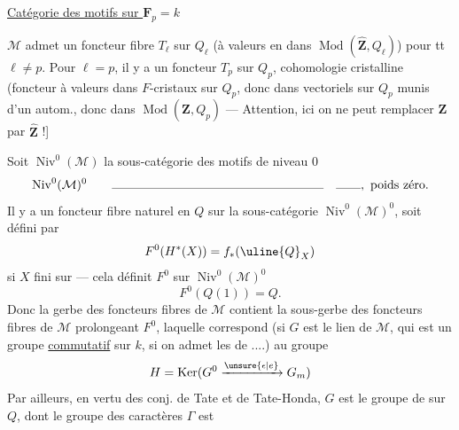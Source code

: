 \uline{Catégorie des motifs sur $\mathbf F_p=k$}

$\mathcal M$ admet un foncteur fibre $T_\ell$ sur $Q_\ell$ (à valeurs en dans $\operatorname{Mod}(\widehat{\mathbf Z},Q_\ell)$) pour tt $\ell\ne p$.
Pour $\ell=p$, il y a un foncteur $T_p$ sur $Q_p$, cohomologie cristalline (foncteur à valeurs dans $F$-cristaux sur $Q_p$, donc dans vectoriels sur $Q_p$ munis d'un autom., donc dans $\operatorname{Mod}(\mathbf Z,Q_p)$ --- Attention, ici on ne peut remplacer $\mathbf Z$ par $\widehat{\mathbf Z}$ !]

Soit  $\operatorname{Niv}^0(\mathcal M)$ la sous-catégorie des motifs de niveau $0$
\[
\operatorname{Niv}^0(\mathcal M)^0\qquad\rule{6cm}{0.3pt}\quad\rule{0.7cm}{0.3pt},\ \text{poids zéro.}
\]
Il y a un foncteur fibre naturel   en $Q$ sur la sous-catégorie $\operatorname{Niv}^0(\mathcal M)^0$, soit
défini par
\[
F^0(H^*(X))=f_*(\uline{Q}_X)
\]
si $X$ fini sur  --- cela définit $F^0$ sur $\operatorname{Niv}^0(\mathcal M)^0$
\[
F^0(Q(1))=Q.
\]
Donc la gerbe  des foncteurs fibres de $\mathcal M$ contient la sous-gerbe  des foncteurs fibres de $\mathcal M$ prolongeant $F^0$, laquelle correspond (si $G$ est le lien de $\mathcal M$, qui est  un groupe \uline{commutatif} sur $k$, si on admet les  de ....) au groupe
\[
H=\operatorname{Ker}(G^0\xrightarrow{\unsure{\epsilon|e}}G_m)
\]
Par ailleurs,  en vertu des conj. de Tate et de Tate-Honda, $G$ est le groupe de  sur $Q$, dont le groupe des caractères $\Gamma$ est
